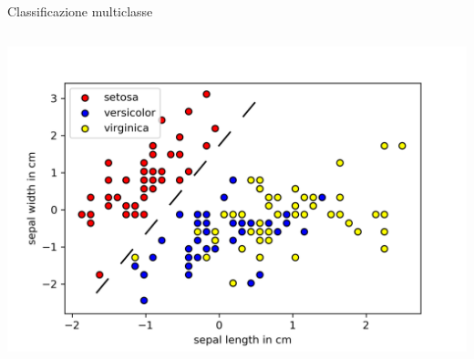 \documentclass{beamer}
\begin{document}
\begin{frame}{Classificazione multiclasse}
\begin{columns}
            \includegraphics[width=\columnwidth]{gfx/iris/irisscaled_separation.png}
        \end{columns}
        

    \end{frame}
\end{document}
